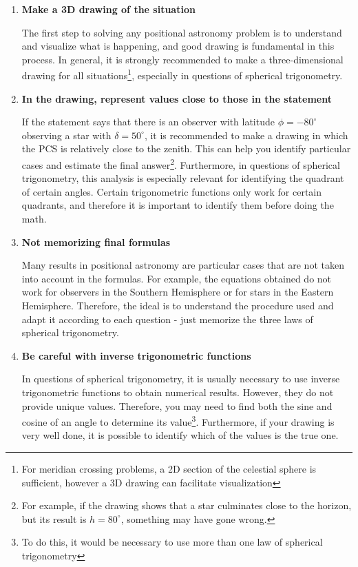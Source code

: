 \documentclass[a4paper,12pt]{extarticle}
\begin{document}
\begin{enumerate}
	\itemsep0em 
	\item \textbf{Make a 3D drawing of the situation}
	
	The first step to solving any positional astronomy problem is to understand and visualize what is happening, and good drawing is fundamental in this process. In general, it is strongly recommended to make a three-dimensional drawing for all situations\footnote{For meridian crossing problems, a 2D section of the celestial sphere is sufficient, however a 3D drawing can facilitate visualization}, especially in questions of spherical trigonometry.
	
	\item \textbf{In the drawing, represent values close to those in the statement}
	
	If the statement says that there is an observer with latitude $\phi = -80^\circ$ observing a star with $\delta = 50^\circ$, it is recommended to make a drawing in which the PCS is relatively close to the zenith. This can help you identify particular cases and estimate the final answer\footnote{For example, if the drawing shows that a star culminates close to the horizon, but its result is $h = 80^\circ$, something may have gone wrong.}. Furthermore, in questions of spherical trigonometry, this analysis is especially relevant for identifying the quadrant of certain angles. Certain trigonometric functions only work for certain quadrants, and therefore it is important to identify them before doing the math.
	
	\item \textbf{Not memorizing final formulas}
	
	Many results in positional astronomy are particular cases that are not taken into account in the formulas. For example, the equations obtained do not work for observers in the Southern Hemisphere or for stars in the Eastern Hemisphere. Therefore, the ideal is to understand the procedure used and adapt it according to each question - just memorize the three laws of spherical trigonometry.
	
	\item \textbf{Be careful with inverse trigonometric functions}
	
	In questions of spherical trigonometry, it is usually necessary to use inverse trigonometric functions to obtain numerical results. However, they do not provide unique values. Therefore, you may need to find both the sine and cosine of an angle to determine its value\footnote{To do this, it would be necessary to use more than one law of spherical trigonometry}. Furthermore, if your drawing is very well done, it is possible to identify which of the values is the true one.
\end{enumerate}
\end{document}

